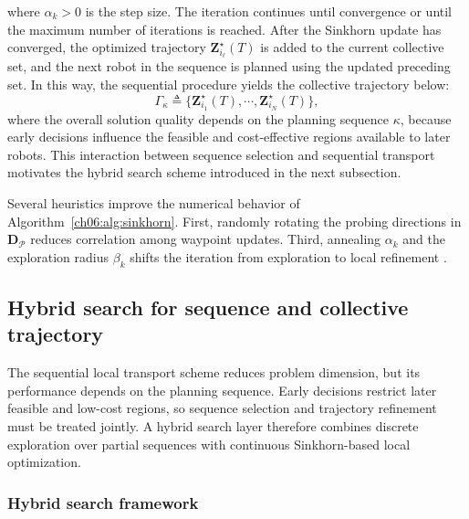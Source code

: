 where $\alpha_k>0$ is the step size.
The iteration continues until convergence or until the maximum number of
iterations is reached.
After the Sinkhorn update has converged, the optimized trajectory
$\mathbf{Z}_{i_\ell}^\star(T)$ is added to the current collective set,
and the next robot in the sequence is planned using the updated
preceding set.
In this way, the sequential procedure yields the collective trajectory below:
\[
\Gamma_\kappa\triangleq
\{\mathbf{Z}_{i_1}^\star(T),\cdots,\mathbf{Z}_{i_N}^\star(T)\},
\]
where the overall solution quality depends on the planning sequence
$\kappa$, because early decisions influence the feasible and
cost-effective regions available to later robots.
This interaction between sequence selection and sequential transport
motivates the hybrid search scheme introduced in the next subsection.

Several heuristics improve the numerical behavior of
Algorithm~\ref{ch06:alg:sinkhorn}. First, randomly rotating the probing
directions in $\boldsymbol{D}_{\mathcal{P}}$ reduces correlation among
waypoint updates.  Third, annealing $\alpha_k$ and the exploration
radius $\beta_k$ shifts the iteration from exploration to local refinement
\citep{altschuler2017near,le2023accelerating}.


\subsection{Hybrid search for sequence and collective trajectory}
\label{ch06:sec:hybrid}

The sequential local transport scheme reduces problem dimension, but its
performance depends on the planning sequence. Early decisions restrict later
feasible and low-cost regions, so sequence selection and trajectory refinement
must be treated jointly. A hybrid search layer therefore combines discrete
exploration over partial sequences with continuous Sinkhorn-based local
optimization.

\subsubsection{Hybrid search framework}
\label{ch06:subsec:search-algorithm}


